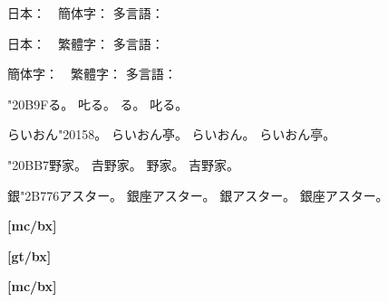 \documentclass[a4paper,titlepage,draft]{\class}
\begin{document}
日本：　簡体字：  多言語：

日本：　繁體字：  多言語：

簡体字：　繁體字：  多言語：

\vspace{\baselineskip}

\ifuptexmode
 \kchar"20B9Fる。
 𠮟る。
\fi
{}る。
叱る。

\ifuptexmode
 らいおん\kchar"20158。
 らいおん𠅘。
\fi
らいおん。
らいおん亭。

\ifuptexmode
 \kchar"20BB7野家。
 𠮷野家。
\fi
{}野家。
吉野家。

\ifuptexmode
 銀\kchar"2B776アスター。
 銀𫝶アスター。
\fi
銀アスター。
銀座アスター。


\clearpage
[mc/m]

\ifuptexmode
 
\fi


{\bfseries%
[mc/bx]

\ifuptexmode
 
\fi


}

{\gtfamily
[gt/m]

\ifuptexmode
 
\fi


{\bfseries%
[gt/bx]

\ifuptexmode
 
\fi


}}

{\mgfamily
[mg/m]

\ifuptexmode
 
\fi


}

\clearpage
[mc/m]






{\bfseries%
[mc/bx]





}
\end{document}
